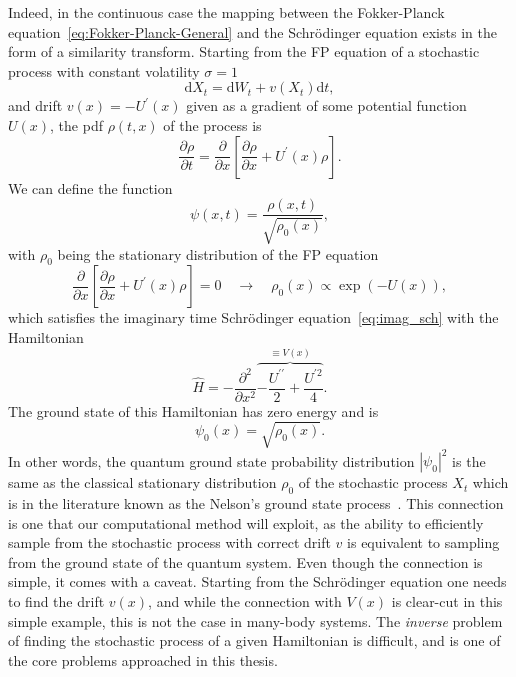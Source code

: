 Indeed, in the continuous case the mapping between the Fokker-Planck equation~\eqref{eq:Fokker-Planck-General} and the Schr\" odinger equation exists in the form of a similarity transform. Starting from the FP equation of a stochastic process with constant volatility $\sigma = 1$
\begin{equation}
\label{eq:not_prime_cont_process}
\mathrm{d} X_{t}=\mathrm{d} W_{t}+v\left(X_{t}\right) \mathrm{d} t,
\end{equation} 
and drift $v(x)=-U^\prime(x)$ given as a gradient of some potential function $U(x)$, the pdf $\rho(t, x)$ of the process is
\begin{equation}
\frac{\partial \rho}{\partial t} = \frac{\partial}{\partial x}\left[\frac{\partial \rho}{\partial x}+U^{\prime}(x) \rho\right].
\end{equation}
We can define the function 
\begin{equation}
\psi(x, t)=\frac{\rho(x, t)}{\sqrt{\rho_{0}(x)}},
\end{equation}
with $\rho_{0}$ being the stationary distribution of the FP equation
\begin{equation}
\frac{\partial}{\partial x}\left[\frac{\partial \rho}{\partial x}+U^{\prime}(x) \rho\right] = 0 \quad \rightarrow \quad \rho_{0}(x) \propto \exp (-U(x)),
\end{equation}
which satisfies the imaginary time Schr\" odinger equation~\eqref{eq:imag_sch} with the Hamiltonian
\begin{equation}
\hat H=-\frac{\partial^{2}}{\partial x^{2}} \overbrace{-\frac{U^{\prime \prime}}{2}+\frac{U^{\prime 2}}{4}}^{\equiv V(x)}.
\end{equation}
The ground state of this Hamiltonian has zero energy and is 
\begin{equation}
\psi_{0}(x)=\sqrt{\rho_{0}(x)}.
\end{equation}
In other words, the quantum ground state probability distribution $|\psi_{0}|^2$ is the same as the classical stationary distribution $\rho_{0}$ of the stochastic process $X_{t}$ which is in the literature known as the {Nelson's ground state process}~\cite{nelson1967dynamical, albeverio1977energy}. This connection is one that our computational method will exploit, as the ability to efficiently sample from the stochastic process with correct drift $v$ is equivalent to sampling from the ground state of the quantum system. Even though the connection is simple, it comes with a caveat. Starting from the Schr\" odinger equation one needs to find the drift $v(x)$, and while the connection with $V(x)$ is clear-cut in this simple example, this is not the case in many-body systems. The \emph{inverse} problem of finding the stochastic process of a given Hamiltonian is difficult, and is one of the core problems approached in this thesis.

